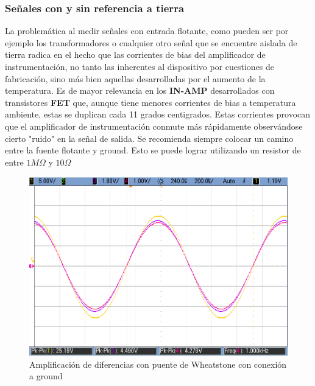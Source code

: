 \subsubsection{Señales con y sin referencia a tierra}
La problemática al medir señales con entrada flotante, como pueden ser por ejemplo los transformadores o cualquier otro señal que se encuentre aislada de tierra radica en el hecho que las corrientes de bias del amplificador de instrumentación, no tanto las inherentes al dispositivo por cuestiones de fabricación, sino más bien aquellas desarrolladas por el aumento de la temperatura. Es de mayor relevancia en los \textbf{IN-AMP} desarrollados con transistores \textbf{FET} que, aunque tiene menores corrientes de bias a temperatura ambiente, estas se duplican cada 11 grados centigrados. Estas corrientes provocan que el amplificador de instrumentación conmute más rápidamente observándose cierto "ruido" en la señal de salida. Se recomienda siempre colocar un camino entre la fuente flotante y ground. Esto se puede lograr utilizando un resistor de entre $1M\Omega$ y  $10\Omega$

\begin{figure}[H]
	\centering
	\includegraphics[height=0.3\textheight]{./ImagenesDeOsciloscopio/WheatStoneTierra1.png}
	\caption{Amplificación de diferencias con puente de Wheatstone con conexión a ground}
\end{figure}

